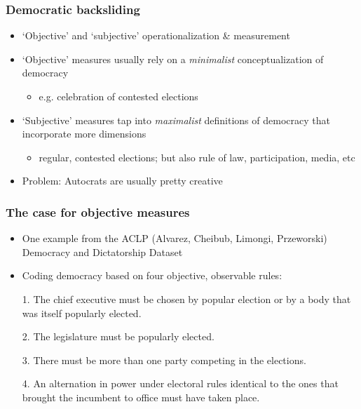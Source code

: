 \documentclass[aspectratio=43]{beamer}
\begin{document}

\begin{frame}
\frametitle{Democratic backsliding}
\centering

\begin{itemize}
  \item `Objective' and `subjective' operationalization \& measurement
  \item `Objective' measures usually rely on a \textit{minimalist} conceptualization of democracy
  \begin{itemize}
    \item e.g. celebration of contested elections
  \end{itemize}
  \item `Subjective' measures tap into \textit{maximalist} definitions of democracy that incorporate more dimensions
  \begin{itemize}
    \item regular, contested elections; but also rule of law, participation, media, etc
  \end{itemize}
  \item Problem: Autocrats are usually pretty creative
\end{itemize}

\end{frame}

\begin{frame}
\frametitle{The case for objective measures}
\centering

\begin{itemize}
  \item One example from the ACLP (Alvarez, Cheibub, Limongi, Przeworski) Democracy and Dictatorship Dataset
  \item Coding democracy based on four objective, observable rules:
  \item[1.] {\small The chief executive must be chosen by popular election or by a body that was itself popularly elected.}
  \item[2.] {\small The legislature must be popularly elected.}
  \item[3.] {\small There must be more than one party competing in the elections.}
  \item[4.] {\small An alternation in power under electoral rules identical to the ones that brought the incumbent to office must have taken place.}
\end{itemize}

\end{frame}
\end{document}
